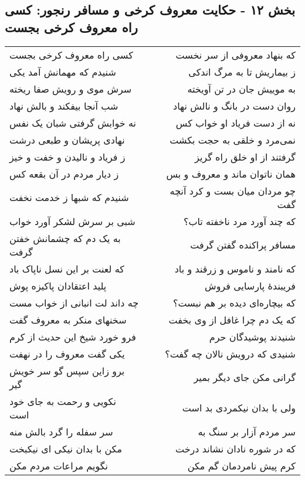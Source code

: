 \begin{center}
\section*{بخش ۱۲ - حکایت معروف کرخی و مسافر رنجور: کسی راه معروف کرخی بجست}
\label{sec:012}
\begin{longtable}{l p{0.5cm} r}
کسی راه معروف کرخی بجست
&&
که بنهاد معروفی از سر نخست
\\
شنیدم که مهمانش آمد یکی
&&
ز بیماریش تا به مرگ اندکی
\\
سرش موی و رویش صفا ریخته
&&
به موییش جان در تن آویخته
\\
شب آنجا بیفکند و بالش نهاد
&&
روان دست در بانگ و نالش نهاد
\\
نه خوابش گرفتی شبان یک نفس
&&
نه از دست فریاد او خواب کس
\\
نهادی پریشان و طبعی درشت
&&
نمی‌مرد و خلقی به حجت بکشت
\\
ز فریاد و نالیدن و خفت و خیز
&&
گرفتند از او خلق راه گریز
\\
ز دیار مردم در آن بقعه کس
&&
همان ناتوان ماند و معروف و بس
\\
شنیدم که شبها ز خدمت نخفت
&&
چو مردان میان بست و کرد آنچه گفت
\\
شبی بر سرش لشکر آورد خواب
&&
که چند آورد مرد ناخفته تاب؟
\\
به یک دم که چشمانش خفتن گرفت
&&
مسافر پراکنده گفتن گرفت
\\
که لعنت بر این نسل ناپاک باد
&&
که نامند و ناموس و زرقند و باد
\\
پلید اعتقادان پاکیزه پوش
&&
فریبندهٔ پارسایی فروش
\\
چه داند لت انبانی از خواب مست
&&
که بیچاره‌ای دیده بر هم نبست؟
\\
سخنهای منکر به معروف گفت
&&
که یک دم چرا غافل از وی بخفت
\\
فرو خورد شیخ این حدیث از کرم
&&
شنیدند پوشیدگان حرم
\\
یکی گفت معروف را در نهفت
&&
شنیدی که درویش نالان چه گفت؟
\\
برو زاین سپس گو سر خویش گیر
&&
گرانی مکن جای دیگر بمیر
\\
نکویی و رحمت به جای خود است
&&
ولی با بدان نیکمردی بد است
\\
سر سفله را گرد بالش منه
&&
سر مردم آزار بر سنگ به
\\
مکن با بدان نیکی ای نیکبخت
&&
که در شوره نادان نشاند درخت
\\
نگویم مراعات مردم مکن
&&
کرم پیش نامردمان گم مکن
\\

\end{longtable}
\end{center}
